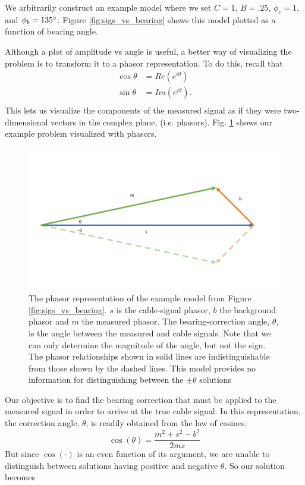 \documentclass[paper=a4, fontsize=11pt]{scrartcl}
\numberwithin{equation}{section}		%
\numberwithin{figure}{section}			%
\numberwithin{table}{section}				%
\begin{document}
\begin{appendices}
We arbitrarily construct an example model where we set $C=1$, $B=.25$, $\phi_c=1$, and $\phi_b=135\degree$. Figure \ref{fig:sigs_vs_bearing} shows this model plotted as a function of bearing angle.

Although a plot of amplitude vs angle is useful, a better way of visualizing the problem is to transform it to a phasor representation.  To do this, recall that
\begin{align}
        \cos{\theta} &= Re\left(e^{i\theta}\right) \\
        \sin{\theta} &= Im\left(e^{i\theta}\right). \\
\end{align}
This lets us visualize the components of the measured signal as if they were two-dimensional vectors in the complex plane, (i.e. phasors). Fig. \ref{fig:phasor_base} shows our example problem visualized with phasors.

\begin{figure}[h]
  \caption{
  The phasor representation of the example model from Figure \ref{fig:sigs_vs_bearing}. $s$ is the cable-signal phasor, $b$ the background phasor and $m$ the measured phasor.  The bearing-correction angle, $\theta$, is the angle between the measured and cable signals.  Note that we can only determine the magnitude of the angle, but not the sign.  The phasor relationships shown in solid lines are indistinguishable from those shown by the dashed lines.  This model provides no information for distinguishing between the $\pm\theta$ solutions}
  \label{fig:phasor_base}
  \centering
  \includegraphics[width=1.0\textwidth]{figures/phasor_base.pdf}
\end{figure}
Our objective is to find the bearing correction that must be applied to the measured signal in order to arrive at the true cable signal. In this representation, the correction angle, $\theta$, is readily obtained from the law of cosines.
\begin{equation} \label{eq:law_of_cos}
    \cos\left(\theta\right) = \frac{m^2 + s^2 - b^2}{2ms}
\end{equation}
But since $\cos\left(\cdot\right)$ is an even function of its argument, we are unable to distinguish between solutions having positive and negative $\theta$.  So our solution becomes


\end{appendices}
\end{document}
